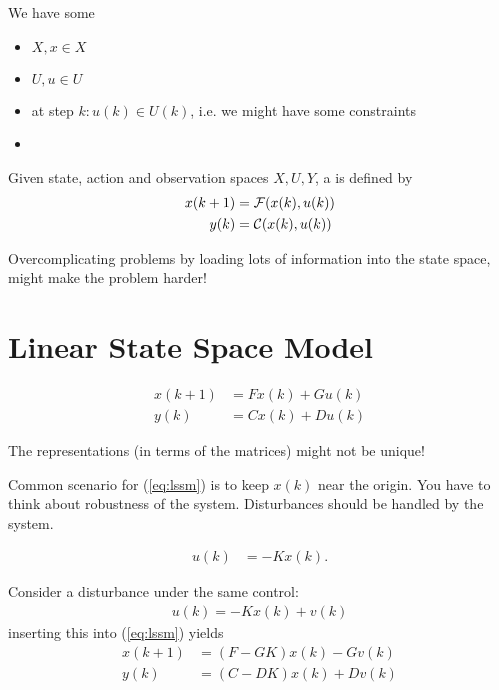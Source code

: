 We have some

\begin{itemize}
    \item {} \(X,x\in X\)
    \item {} \(U, u\in U\)
    \item {} at step \(k: u(k)\in U(k)\), i.e. we might have some constraints
    \item {}
\end{itemize}

\begin{definition}\label{def:1.1} 
    Given state, action and observation spaces \(X,U,Y\), a 
    is defined by
    \begin{align}\label{eq:1}
        x(k+1)&=\mathcal{F}(x(k),u(k))\\
        y(k)&=\mathcal{C}(x(k),u(k))  
    \end{align}
\end{definition}

\begin{remark}
    Overcomplicating problems by loading lots of information into the state space, might make the problem harder!
\end{remark}

\section{Linear State Space Model}

\begin{align}\label{eq:lssm}
    x(k+1)&=Fx(k)+Gu(k)\\
    y(k)&=Cx(k)+Du(k)
\end{align}

\begin{remark}
    The representations (in terms of the matrices) might not be unique!
\end{remark}

Common scenario for (\ref{eq:lssm}) is to keep \(x(k)\) near the origin. You have to think about robustness of the system. 
Disturbances should be handled by the system. 

\begin{align*}
    u(k)&=-Kx(k).
\end{align*}

Consider a disturbance under the same control:
\begin{align*}
    u(k)=-Kx(k)+v(k)
\end{align*} 
inserting this into (\ref{eq:lssm}) yields
\begin{align*}
    x(k+1) &= (F-GK)x(k)-Gv(k)\\
    y(k) &= (C-DK)x(k)+Dv(k)
\end{align*}

